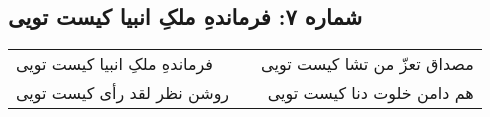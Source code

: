 \begin{center}
\section*{شماره ۷: فرماندهِ ملکِ انبیا کیست تویی}
\label{sec:007}
\begin{longtable}{l p{0.5cm} r}
فرماندهِ ملکِ انبیا کیست تویی
&&
مصداق تعزّ من تشا کیست تویی
\\
روشن نظر لقد رأی کیست تویی
&&
هم دامن خلوت دنا کیست تویی
\\
\end{longtable}
\end{center}
